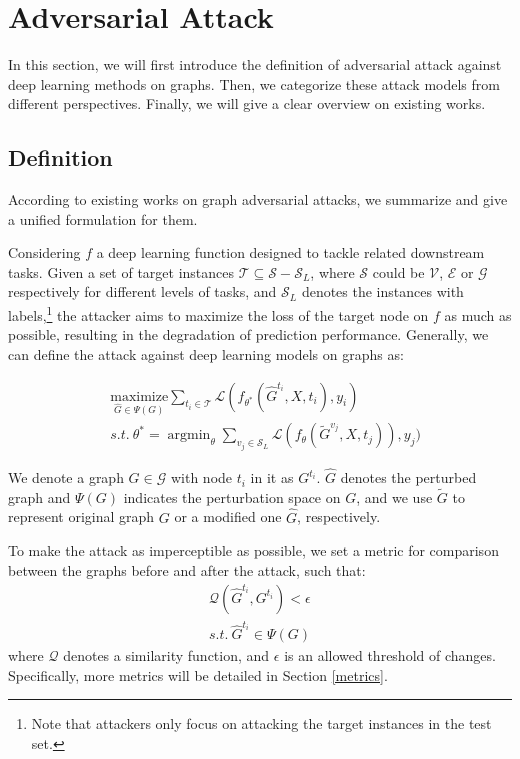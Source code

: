 
\section{Adversarial Attack}
\label{attack}
In this section, we will first introduce the definition of adversarial attack against deep learning methods on graphs. Then,  we categorize these attack models from different perspectives. Finally, we will give a clear overview on existing works.

\subsection{Definition}
\label{attackDefinition}
According to existing works on graph adversarial attacks, we summarize and give a unified formulation for them.

 Considering $f$ a deep learning function designed to tackle related downstream tasks. Given a set of target instances $\mathcal{T} \subseteq \mathcal{S}-\mathcal{S}_L$, where $\mathcal{S}$ could be $\mathcal{V}$, $\mathcal{E}$ or $\mathcal{G}$ respectively for different levels of tasks, and $\mathcal{S}_L$ denotes the instances with labels,\footnote{Note that attackers only focus on attacking the target instances in the test set.} the attacker aims to maximize the loss of the target node on $f$ as much as possible, resulting in the degradation of prediction performance. Generally, we can define the attack against deep learning models on graphs as:

\begin{equation}
	\label{definition}
	\begin{split}
		& \underset{\hat{G} \in \Psi(G)}{\text{maximize}} \sum_{t_i \in \mathcal{T}} \mathcal{L}(f_{\theta^{\ast}}(\hat{G}^{t_i}, X, t_i), y_i)  \\
		& s.t. \ \theta^{\ast} = \mathop{\arg \min}_{\theta} \sum_{v_j \in \mathcal{S}_L}\mathcal{L}(f_{\theta}(\tilde{G}^{v_j}, X, t_j)), y_j)
	\end{split}
\end{equation}

We denote a graph $G \in \mathcal{G}$ with node $t_i$ in it as $G^{t_i}$. $\hat{G}$ denotes the perturbed graph and $\Psi(G)$ indicates the perturbation space on $G$, and we use $\tilde{G}$ to represent original graph $G$ or a modified one $\hat{G}$, respectively.

To make the attack as imperceptible as possible, we set a metric for comparison between the graphs before and after the attack, such that:
\begin{equation}
	\begin{split}
		\mathcal{Q}(\hat{G}^{t_i}, G^{t_i}) < \epsilon \\ s.t.\ \hat{G}^{t_i} \in \Psi(G)
	\end{split}
\end{equation}
where $\mathcal{Q}$ denotes a similarity function, and $\epsilon$ is an allowed threshold of changes. Specifically, more metrics will be detailed in Section \ref{metrics}.


